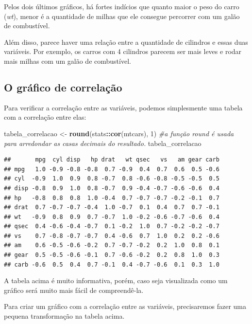 \documentclass[
]{book}
\newenvironment{Shaded}{\begin{snugshade}}{\end{snugshade}}
\newcommand{\CommentTok}[1]{\textcolor[rgb]{0.56,0.35,0.01}{\textit{#1}}}
\newcommand{\DecValTok}[1]{\textcolor[rgb]{0.00,0.00,0.81}{#1}}
\newcommand{\KeywordTok}[1]{\textcolor[rgb]{0.13,0.29,0.53}{\textbf{#1}}}
\newcommand{\NormalTok}[1]{#1}
\newcommand{\OperatorTok}[1]{\textcolor[rgb]{0.81,0.36,0.00}{\textbf{#1}}}
\newcommand{\StringTok}[1]{\textcolor[rgb]{0.31,0.60,0.02}{#1}}
\begin{document}
Pelos dois últimos gráficos, há fortes indícios que quanto maior o peso
do carro (\emph{wt}), menor é a quantidade de milhas que ele consegue
percorrer com um galão de combustível.

Além disso, parece haver uma relação entre a quantidade de cilindros e
essas duas variáveis. Por exemplo, os carros com 4 cilindros parecem ser
mais leves e rodar mais milhas com um galão de combustível.

\hypertarget{o-gruxe1fico-de-correlauxe7uxe3o}{%
\subsection{O gráfico de
correlação}\label{o-gruxe1fico-de-correlauxe7uxe3o}}

Para verificar a correlação entre as variáveis, podemos simplesmente uma
tabela com a correlação entre elas:

\begin{Shaded}
\begin{Highlighting}[]
\NormalTok{tabela_correlacao <-}\StringTok{ }\KeywordTok{round}\NormalTok{(stats}\OperatorTok{::}\KeywordTok{cor}\NormalTok{(mtcars), }\DecValTok{1}\NormalTok{) }\CommentTok{#a função round é usada para arredondar as casas decimais do resultado.}
\NormalTok{tabela_correlacao}
\end{Highlighting}
\end{Shaded}

\begin{verbatim}
##       mpg  cyl disp   hp drat   wt qsec   vs   am gear carb
## mpg   1.0 -0.9 -0.8 -0.8  0.7 -0.9  0.4  0.7  0.6  0.5 -0.6
## cyl  -0.9  1.0  0.9  0.8 -0.7  0.8 -0.6 -0.8 -0.5 -0.5  0.5
## disp -0.8  0.9  1.0  0.8 -0.7  0.9 -0.4 -0.7 -0.6 -0.6  0.4
## hp   -0.8  0.8  0.8  1.0 -0.4  0.7 -0.7 -0.7 -0.2 -0.1  0.7
## drat  0.7 -0.7 -0.7 -0.4  1.0 -0.7  0.1  0.4  0.7  0.7 -0.1
## wt   -0.9  0.8  0.9  0.7 -0.7  1.0 -0.2 -0.6 -0.7 -0.6  0.4
## qsec  0.4 -0.6 -0.4 -0.7  0.1 -0.2  1.0  0.7 -0.2 -0.2 -0.7
## vs    0.7 -0.8 -0.7 -0.7  0.4 -0.6  0.7  1.0  0.2  0.2 -0.6
## am    0.6 -0.5 -0.6 -0.2  0.7 -0.7 -0.2  0.2  1.0  0.8  0.1
## gear  0.5 -0.5 -0.6 -0.1  0.7 -0.6 -0.2  0.2  0.8  1.0  0.3
## carb -0.6  0.5  0.4  0.7 -0.1  0.4 -0.7 -0.6  0.1  0.3  1.0
\end{verbatim}

A tabela acima é muito informativa, porém, caso seja visualizada como um
gráfico será muito mais fácil de compreendê-la.

Para criar um gráfico com a correlação entre as variáveis, precisaremos
fazer uma pequena transformação na tabela acima.
\end{document}
